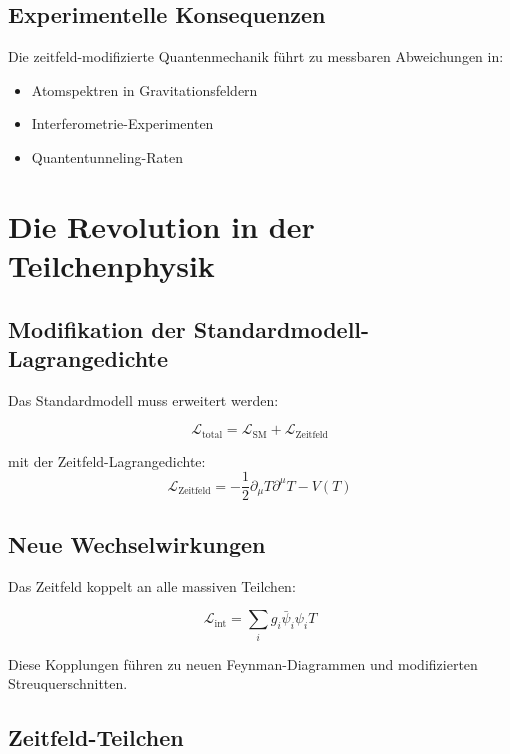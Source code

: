 \documentclass[12pt,a4paper]{report}
\begin{document}
\subsection{Experimentelle Konsequenzen}

Die zeitfeld-modifizierte Quantenmechanik führt zu messbaren Abweichungen in:
\begin{itemize}
	\item Atomspektren in Gravitationsfeldern
	\item Interferometrie-Experimenten
	\item Quantentunneling-Raten
\end{itemize}

\section{Die Revolution in der Teilchenphysik}

\subsection{Modifikation der Standardmodell-Lagrangedichte}

Das Standardmodell muss erweitert werden:

\begin{equation}
	\mathcal{L}_{\text{total}} = \mathcal{L}_{\text{SM}} + \mathcal{L}_{\text{Zeitfeld}}
\end{equation}

mit der Zeitfeld-Lagrangedichte:
\begin{equation}
	\mathcal{L}_{\text{Zeitfeld}} = -\frac{1}{2}\partial_\mu T \partial^\mu T - V(T)
\end{equation}

\subsection{Neue Wechselwirkungen}

Das Zeitfeld koppelt an alle massiven Teilchen:

\begin{equation}
	\mathcal{L}_{\text{int}} = \sum_i g_i \bar{\psi}_i \psi_i T
\end{equation}

Diese Kopplungen führen zu neuen Feynman-Diagrammen und modifizierten Streuquerschnitten.

\subsection{Zeitfeld-Teilchen}
\end{document}
